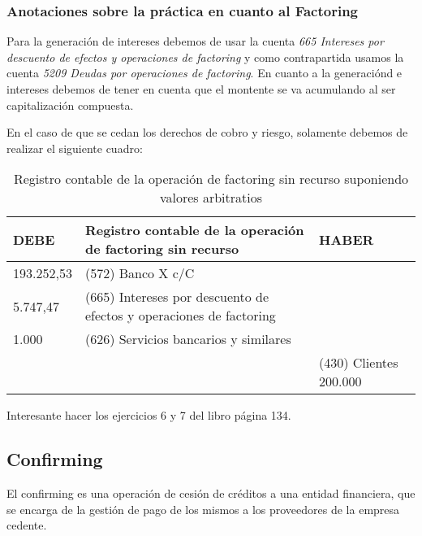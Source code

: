 \documentclass[a4paper,12pt]{article}
\begin{document}
\subsubsection*{Anotaciones sobre la práctica en cuanto al Factoring}

Para la generación de intereses debemos de usar la cuenta \textit{665 Intereses por descuento de efectos y operaciones de factoring} y como contrapartida usamos la cuenta \textit{5209 Deudas por operaciones de factoring}. En cuanto a la generaciónd e intereses debemos de tener en cuenta que el montente se va acumulando al ser capitalización compuesta.

En el caso de que se cedan los derechos de cobro y riesgo, solamente debemos de realizar el siguiente cuadro:

\begin{center}
    \begin{table}[H]
        \begin{tabular}{|l|p{5cm}|l|}
        \hline
        \textbf{DEBE} & \textbf{Registro contable de la operación de factoring sin recurso} & \textbf{HABER} \\ \hline
        193.252,53 & (572) Banco X c/C & \\ \hline
        5.747,47 & (665) Intereses por descuento de efectos y operaciones de factoring & \\ \hline
        1.000 & (626) Servicios bancarios y similares & \\ \hline
        & & (430) Clientes 200.000 \\ \hline
        \end{tabular}
        \caption{Registro contable de la operación de factoring sin recurso suponiendo valores arbitratios}
    \end{table}
\end{center}
    


\begin{tcolorbox}[colback=blue!5!white,colframe=green!75!black,fonttitle=\bfseries,title=Ejercicios Recomendados]
    Interesante hacer los ejercicios 6 y 7 del libro página 134.

    
\end{tcolorbox}

\subsection{Confirming}

El confirming es una operación de cesión de créditos a una entidad financiera, que se encarga de la gestión de pago de los mismos a los proveedores de la empresa cedente.\\
\end{document}

